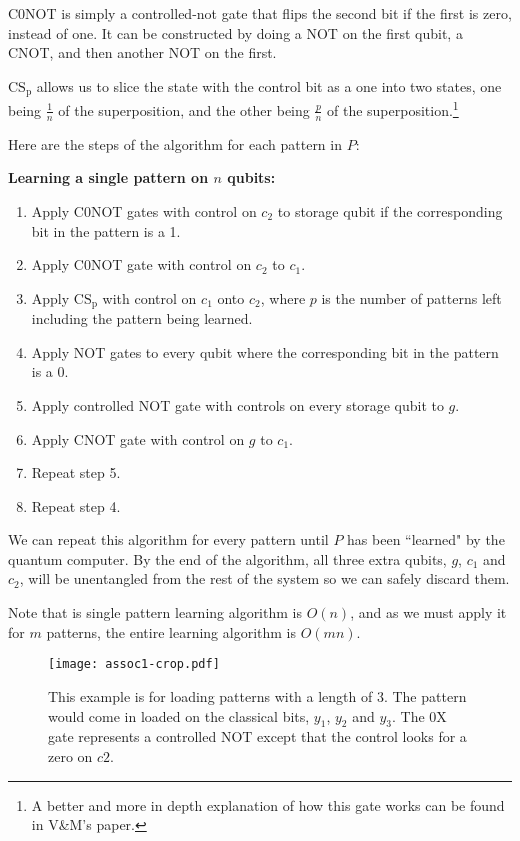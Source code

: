 \documentclass[11pt]{article}
\begin{document}
C0NOT is simply a controlled-not gate that flips the second bit if the first is zero, instead of one. It can be constructed by doing a NOT on the first qubit, a CNOT, and then another NOT on the first.

$\mathrm{CS_p}$ allows us to slice the state with the control bit as a one into two states, one being $\frac{1}{n}$ of the superposition, and the other being $\frac{p}{n}$ of the superposition.\footnote{A better and more in depth explanation of how this gate works can be found in V\&M's paper.}

Here are the steps of the algorithm for each pattern in $P$:

\begin{framed}
\textbf{Learning a single pattern on $n$ qubits:}
\begin{enumerate}
	\item Apply C0NOT gates with control on $c_2$ to storage qubit if the corresponding bit in the pattern is a 1.
	\item Apply C0NOT gate with control on $c_2$ to $c_1$.
	\item Apply $\mathrm{CS_p}$ with control on $c_1$ onto $c_2$, where $p$ is the number of patterns left including the pattern being learned.
	\item Apply NOT gates to every qubit where the corresponding bit in the pattern is a 0.
	\item Apply controlled NOT gate with controls on every storage qubit to $g$.
	\item Apply CNOT gate with control on $g$ to $c_1$.
	\item Repeat step 5.
	\item Repeat step 4.
\end{enumerate}
\end{framed}

We can repeat this algorithm for every pattern until $P$ has been ``learned" by the quantum computer. By the end of the algorithm, all three extra qubits, $g$, $c_1$ and $c_2$, will be unentangled from the rest of the system so we can safely discard them.

Note that is single pattern learning algorithm is $O(n)$, and as we must apply it for $m$ patterns, the entire learning algorithm is $O(mn)$.

\begin{figure}[!htb]
\centering
\texttt{[image: assoc1-crop.pdf]}
\caption{This example is for loading patterns with a length of 3. The pattern would come in loaded on the classical bits, $y_1$, $y_2$ and $y_3$. The 0X gate represents a controlled NOT except that the control looks for a zero on $c2$.}
\label{fig:digraph}
\end{figure}
\end{document}
